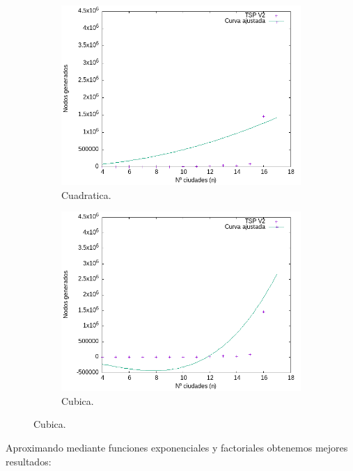 \documentclass{article}
\begin{document}
\begin{figure}[H]
    \centering
    \begin{subfigure}[b]{0.45\textwidth}
        \centering
        \includegraphics[width=\textwidth]{imagenes/Data/CurvaAjustadaCuadratica.png}
        \caption{Cuadratica.}
    \end{subfigure}
    \begin{subfigure}[b]{0.45\textwidth}
        \centering
        \includegraphics[width=\textwidth]{imagenes/Data/CurvaAjustadaCubica.png}
        \caption{Cubica.}
    \end{subfigure}
\end{figure}

Aproximando mediante funciones exponenciales y factoriales obtenemos 
mejores resultados: 
\end{document}
